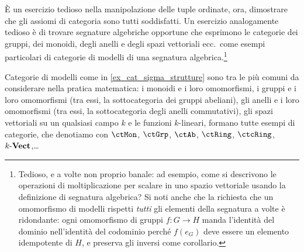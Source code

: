 \`E un esercizio tedioso nella manipolazione delle tuple ordinate, ora, dimostrare che gli assiomi di categoria sono tutti soddisfatti. Un esercizio analogamente tedioso è di trovare segnature algebriche opportune che esprimono le categorie dei gruppi, dei monoidi, degli anelli e degli spazi vettoriali ecc.\ come esempi particolari di categorie di modelli di una segnatura algebrica.\footnote{Tedioso, e a volte non proprio banale: ad esempio, come si descrivono le operazioni di moltiplicazione per scalare in uno spazio vettoriale usando la definizione di segnatura algebrica? Si noti anche che la richiesta che un omomorfismo di modelli rispetti \emph{tutti} gli elementi della segnatura a volte è ridondante: ogni omomorfismo di gruppi \(f : G\to H\) manda l'identità del dominio nell'identità del codominio perché \(f(e_G)\) deve essere un elemento idempotente di \(H\), e preserva gli inversi come corollario.}
\begin{remark}\label{varie_categorie_nella_pratica}
	Categorie di modelli come in \ref{ex_cat_sigma_strutture} sono tra le più comuni da considerare nella pratica matematica: i monoidi e i loro omomorfismi, i gruppi e i loro omomorfismi (tra essi, la sottocategoria dei gruppi abeliani), gli anelli e i loro omomorfismi (tra essi, la sottocategoria degli anelli commutativi), gli spazi vettoriali su un qualsiasi campo \(k\) e le funzioni \(k\)-lineari, formano tutte esempi di categorie, che denotiamo con \(\ctMon\), \(\ctGrp\), \(\ctAb\), \(\ctRing\), \(\ctcRing\), \(\ctVect[k]\),\dots
\end{remark}
